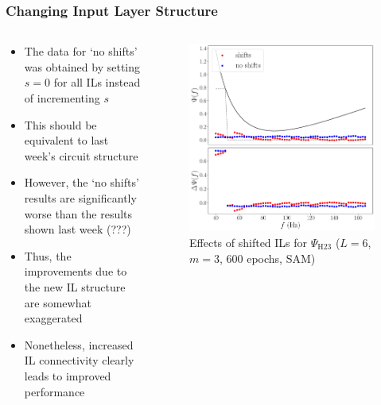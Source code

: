 \documentclass{beamer}
\begin{document}
\begin{frame}
\frametitle{Changing Input Layer Structure}
\begin{columns}
\begin{column}{0.5\textwidth}
\begin{itemize}
\item The data for `no shifts' was obtained by setting  $s=0$ for all ILs instead of incrementing $s$
\item This should be equivalent to last week's circuit structure 
\item However, the `no shifts' results are significantly worse than the results shown last week (\alert{???})
\item Thus, the improvements due to the new IL structure are somewhat exaggerated  
\item Nonetheless, \alert{increased IL connectivity clearly leads to improved performance}
\end{itemize}
\end{column}
\begin{column}{0.5\textwidth}
\begin{figure}
\centering 
\includegraphics[width=\textwidth]{im/phase_shift_comp_psi_m3}
\caption{Effects of shifted ILs for $\Psi_\text{H23}$ ($L=6$, $m=3$, 600 epochs, SAM)}
\end{figure}
\end{column}
\end{columns}
\end{frame}
\end{document}
